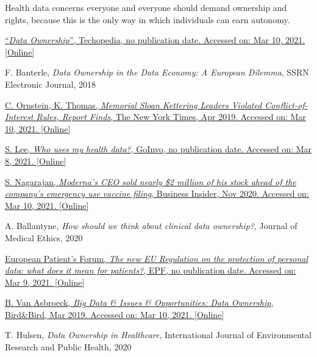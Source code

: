\documentclass[12pt]{article}
\begin{document}
	Health data concerns everyone and everyone should demand ownership and rights, because this is the only way in which individuals can earn autonomy.
	
	
	\clearpage
	\begin{thebibliography}{}
		\footnotesize
		
		\href{https://www.techopedia.com/definition/29059/data-ownership}{``\textit{Data Ownership}'', Techopedia, no publication date. Accessed on: Mar 10, 2021. [Online]}
		
		F. Banterle, \textit{Data Ownership in the Data Economy: A European Dilemma}, SSRN Electronic Journal, 2018
		
		\href{https://www.nytimes.com/2019/04/04/health/memorial-sloan-kettering-conflicts-.html}{C. Ornstein, K. Thomas, \textit{Memorial Sloan Kettering Leaders Violated Conflict-of-Interest Rules, Report Finds}, The New York Times, Apr 2019. Accessed on: Mar 10, 2021. [Online]}
		
		\href{https://www.goinvo.com/vision/who-uses-my-health-data/}{S. Lee, \textit{Who uses my health data?}, GoInvo, no publication date. Accessed on: Mar 8, 2021. [Online]}
		
		\href{https://markets.businessinsider.com/news/stocks/moderna-ceo-sold-million-stock-company-emergency-use-vaccine-filing-2020-11-1029830266}{S. Nagarajan,\textit{ Moderna's CEO sold nearly \$2 million of his stock ahead of the company's emergency use vaccine filing}, Business Insider, Nov 2020. Accessed on: Mar 10, 2021. [Online]} 
		
		A. Ballantyne, \textit{How should we think about clinical data ownership?}, Journal of Medical Ethics, 2020
		
		\href{https://www.eu-patient.eu/globalassets/policy/data-protection/data-protection-guide-for-patients-organisations.pdf}{European Patient's Forum, \textit{The new EU Regulation on the protection of personal data: what does it mean for patients?}, EPF, no publication date. Accessed on: Mar 9, 2021. [Online]}
		
		\href{https://www.twobirds.com/en/news/articles/2019/global/big-data-and-issues-and-opportunities-data-ownership}{B. Van Asbroeck, \textit{Big Data \& Issues \& Opportunities: Data Ownership}, Bird\&Bird, Mar 2019. Accessed on: Mar 10, 2021. [Online]}
		
		T. Hulsen, \textit{Data Ownership in Healthcare}, International Journal of Environmental Research and Public Health, 2020
		

\end{thebibliography}
\end{document}
